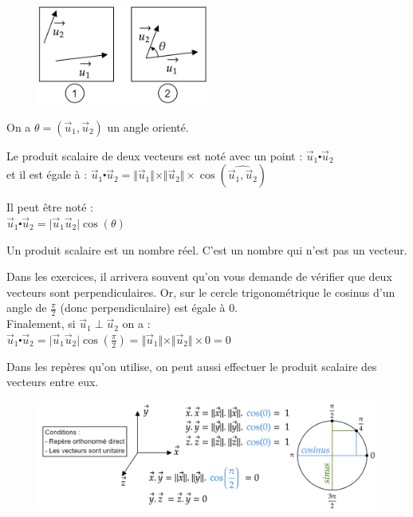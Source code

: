 \documentclass[
	11pt, %
	fleqn, %
	a4paper, %
]{LegrandOrangeBook}
\begin{document}
\begin{figure}[H] %
	\centering %
	\includegraphics[width=0.5\textwidth]{Images/sca1.png} %
\end{figure}
On a $\theta = (\Vec{u}_1, \Vec{u}_2)$ un angle orienté.
\begin{definition}
    Le produit scalaire de deux vecteurs est noté avec un point : $\Vec{u}_1 \centerdot \Vec{u}_2$ \\
    et il est égale à : $\Vec{u}_1 \centerdot \Vec{u}_2 = \Vert \Vec{u}_1 \Vert \times \Vert \Vec{u}_2 \Vert \times \cos ( \widehat{\Vec{u}_1, \Vec{u}_2 } )$
    
\end{definition}

Il peut être noté : \\
$\Vec{u}_1 \centerdot \Vec{u}_2 = \vert \Vec{u}_1 \Vec{u}_2 \vert \cos(\theta)$

Un produit scalaire est un nombre réel. C'est un nombre qui n'est pas un vecteur.

\begin{theorem}
    Dans les exercices, il arrivera souvent qu'on vous demande de vérifier que deux vecteurs sont perpendiculaires. Or, sur le cercle trigonométrique le cosinus d'un angle de $\frac{\pi}{2}$ (donc perpendiculaire) est égale à 0. \\
    Finalement, si $\Vec{u}_1 \perp \Vec{u}_2$ on a : \\
    $\Vec{u}_1 \centerdot \Vec{u}_2= \vert \Vec{u}_1 \Vec{u}_2 \vert \cos(\frac{\pi}{2}) = \Vert \Vec{u}_1 \Vert \times \Vert \Vec{u}_2 \Vert \times 0 = 0 $
\end{theorem}

Dans les repères qu'on utilise, on peut aussi effectuer le produit scalaire des vecteurs entre eux.

\begin{figure}[H] %
	\centering %
	\includegraphics[width=1\textwidth]{Images/sca2.png} %
\end{figure}
\end{document}
